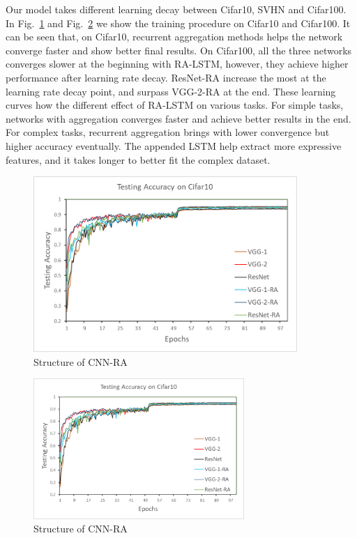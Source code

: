 \documentclass[runningheads]{llncs}
\begin{document}
Our model takes different learning decay between Cifar10, SVHN and Cifar100. In Fig.~\ref{fig:Cifar10} and Fig.~\ref{fig:Cifar100} we show the training procedure on Cifar10 and Cifar100. It can be seen that, on Cifar10, recurrent aggregation methods helps the network converge faster and show better final results. On Cifar100, all the three networks converges slower at the beginning with RA-LSTM, however, they achieve higher performance after learning rate decay. ResNet-RA increase the most at the learning rate decay point, and surpass VGG-2-RA at the end. These learning curves how the different effect of RA-LSTM on various tasks. For simple tasks, networks with aggregation converges faster and achieve better results in the end. For complex tasks, recurrent aggregation brings with lower convergence but higher accuracy eventually. The appended LSTM help extract more expressive features, and it takes longer to better fit the complex dataset.
\begin{figure}   
	\centering
	\includegraphics[width=10cm]{Figures/Cifar10.png}
	\caption{Structure of CNN-RA}
	\label{fig:Cifar10}
\end{figure}
\begin{figure}  
	\centering
	\includegraphics[width=8cm]{Figures/Cifar10.png}
	\caption{Structure of CNN-RA}
	\label{fig:Cifar100}
\end{figure}
\end{document}
